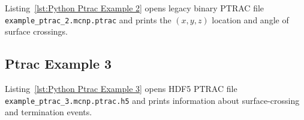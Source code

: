 \documentclass[11pt]{article}
\begin{document}
Listing~\ref{lst:Python Ptrac Example 2} opens legacy binary PTRAC file
\texttt{example\_ptrac\_2.mcnp.ptrac} and prints the $\left(x,y,z\right)$
location and angle of surface crossings.



\clearpage
\subsection{Ptrac Example 3}\label{ptrac-example-3-1}

Listing~\ref{lst:Python Ptrac Example 3} opens HDF5 PTRAC file
\texttt{example\_ptrac\_3.mcnp.ptrac.h5} and prints information about
surface-crossing and termination events.


\end{document}
